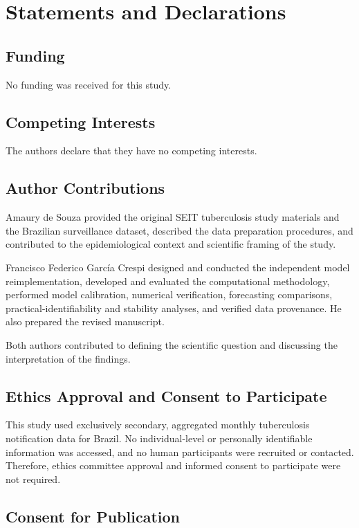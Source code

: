 \documentclass[pdflatex,sn-mathphys-ay,lineno]{sn-jnl}
\begin{document}
\section{Statements and Declarations}

\subsection{Funding}

No funding was received for this study.

\subsection{Competing Interests}

The authors declare that they have no competing interests.


\subsection{Author Contributions}

Amaury de Souza provided the original SEIT tuberculosis study materials and the Brazilian surveillance dataset, described the data preparation procedures, and contributed to the epidemiological context and scientific framing of the study.

Francisco Federico Garc\'ia Crespi designed and conducted the independent model reimplementation, developed and evaluated the computational methodology, performed model calibration, numerical verification, forecasting comparisons, practical-identifiability and stability analyses, and verified data provenance. He also prepared the revised manuscript.

Both authors contributed to defining the scientific question and discussing the interpretation of the findings.


\subsection{Ethics Approval and Consent to Participate}

This study used exclusively secondary, aggregated monthly tuberculosis notification data for Brazil. No individual-level or personally identifiable information was accessed, and no human participants were recruited or contacted. Therefore, ethics committee approval and informed consent to participate were not required.

\subsection{Consent for Publication}
\end{document}
